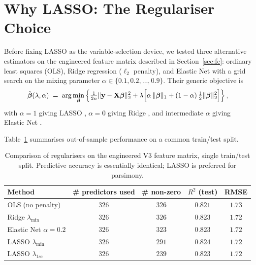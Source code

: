 \documentclass[11pt,a4paper]{article}
\begin{document}
\section{Why LASSO: The Regulariser Choice}
\label{sec:regulariser}

Before fixing LASSO as the variable-selection device, we tested three
alternative estimators on the engineered feature matrix described in
Section~\ref{sec:fe}: ordinary least squares (OLS), Ridge regression
(\(\ell_{2}\) penalty), and Elastic Net with a grid search on the
mixing parameter \(\alpha \in \{0.1, 0.2, \ldots, 0.9\}\). Their
generic objective is
\begin{equation}
  \hat{\boldsymbol{\beta}}(\lambda,\alpha) \;=\;
  \arg\min_{\boldsymbol{\beta}}
  \left\{
    \tfrac{1}{2n}
    \lVert \mathbf{y} - \mathbf{X}\boldsymbol{\beta} \rVert_{2}^{2}
    + \lambda
    \Bigl[
      \alpha\,\lVert \boldsymbol{\beta} \rVert_{1}
      + (1-\alpha)\,\tfrac{1}{2}\lVert \boldsymbol{\beta} \rVert_{2}^{2}
    \Bigr]
  \right\},
  \label{eq:enet}
\end{equation}
with \(\alpha=1\) giving LASSO \citep{tibshirani1996}, \(\alpha=0\)
giving Ridge \citep{hoerlkennard1970}, and intermediate \(\alpha\)
giving Elastic Net \citep{zouhastie2005}.

Table~\ref{tab:regulariser} summarises out-of-sample performance on a
common train/test split.

\begin{table}[h!]
  \centering
  \begin{tabular}{lcccc}
    \toprule
    Method & \# predictors used & \# non-zero & \(R^{2}\) (test) & RMSE \\
    \midrule
    OLS (no penalty)             & \(326\) & \(326\) & \(0.821\) & \(1.73\) \\
    Ridge \(\lambda_{\min}\)     & \(326\) & \(326\) & \(0.823\) & \(1.72\) \\
    Elastic Net \(\alpha=0.2\)   & \(326\) & \(323\) & \(0.823\) & \(1.72\) \\
    LASSO \(\lambda_{\min}\)     & \(326\) & \(291\) & \(0.824\) & \(1.72\) \\
    LASSO \(\lambda_{\mathrm{1se}}\) & \(326\) & \(239\) & \(0.823\) & \(1.72\) \\
    \bottomrule
  \end{tabular}
  \caption{Comparison of regularisers on the engineered V3 feature
    matrix, single train/test split. Predictive accuracy is essentially
    identical; LASSO is preferred for parsimony.}
  \label{tab:regulariser}
\end{table}
\end{document}
